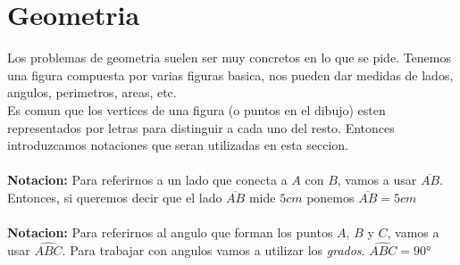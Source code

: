 \documentclass{article}
\begin{document}
\section{Geometria}
\begin{normalsize}
Los problemas de geometria suelen ser muy concretos en lo que se pide. Tenemos una figura compuesta por varias figuras basica, nos pueden dar medidas de lados, angulos, perimetros, areas, etc.\\
Es comun que los vertices de una figura (o puntos en el dibujo) esten representados por letras para distinguir a cada uno del resto. Entonces introduzcamos notaciones que seran utilizadas en esta seccion.\\\\
\textbf{Notacion:} Para referirnos a un lado que conecta a $A$ con $B$, vamos a usar $\overline{AB}$. Entonces, si queremos decir que el lado $\overline{AB}$ mide $5cm$ ponemos $\overline{AB}=5cm$\\\\
\textbf{Notacion:} Para referirnos al angulo que forman los puntos $A$, $B$ y $C$, vamos a usar $\widehat{ABC}$. Para trabajar con angulos vamos a utilizar los \textit{grados}. $\widehat{ABC}=90$°\\\\
\end{normalsize}
\end{document}
